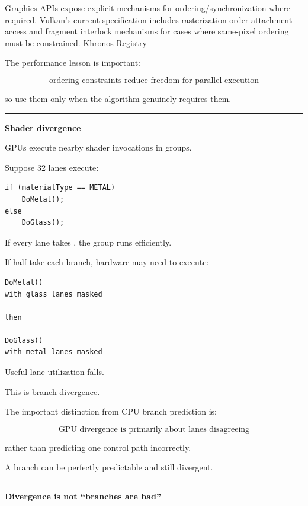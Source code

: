 Graphics APIs expose explicit mechanisms for ordering/synchronization where required. Vulkan's current specification includes rasterization-order attachment access and fragment interlock mechanisms for cases where same-pixel ordering must be constrained. \href{https://registry.khronos.org/vulkan/specs/latest/pdf/vkspec.pdf?utm_source=chatgpt.com}{Khronos Registry}

The performance lesson is important:

\[
\boxed{
\text{ordering constraints reduce freedom for parallel execution}
}
\]

so use them only when the algorithm genuinely requires them.

\begin{center}\rule{0.5\linewidth}{0.5pt}\end{center}

\textbf{Shader divergence}

GPUs execute nearby shader invocations in groups.

Suppose 32 lanes execute:

\begin{verbatim}
if (materialType == METAL)
    DoMetal();
else
    DoGlass();
\end{verbatim}

If every lane takes , the group runs efficiently.

If half take each branch, hardware may need to execute:

\begin{verbatim}
DoMetal()
with glass lanes masked

then

DoGlass()
with metal lanes masked
\end{verbatim}

Useful lane utilization falls.

This is branch divergence.

The important distinction from CPU branch prediction is:

\[
\boxed{
\text{GPU divergence is primarily about lanes disagreeing}
}
\]

rather than predicting one control path incorrectly.

A branch can be perfectly predictable and still divergent.

\begin{center}\rule{0.5\linewidth}{0.5pt}\end{center}

\textbf{Divergence is not ``branches are bad''}

